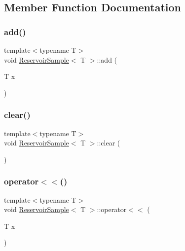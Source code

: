 \subsection{Member Function Documentation}
\mbox{\label{class_reservoir_sample_a471e41debe8c7081cbae2f5a1ca4ab54}} 
\subsubsection{\texorpdfstring{add()}{add()}}
{\footnotesize\ttfamily template$<$typename T$>$ \\
void \hyperlink{class_reservoir_sample}{Reservoir\+Sample}$<$ T $>$\+::add (\begin{DoxyParamCaption}\item[{T}]{x }\end{DoxyParamCaption})\hspace{0.3cm}{\ttfamily [inline]}}

\mbox{\label{class_reservoir_sample_a8527b800cc94f227a7793e8c93055d82}} 
\subsubsection{\texorpdfstring{clear()}{clear()}}
{\footnotesize\ttfamily template$<$typename T$>$ \\
void \hyperlink{class_reservoir_sample}{Reservoir\+Sample}$<$ T $>$\+::clear (\begin{DoxyParamCaption}{ }\end{DoxyParamCaption})\hspace{0.3cm}{\ttfamily [inline]}}

\mbox{\label{class_reservoir_sample_a06e60e404cf49a9261f51d6b07bbf017}} 
\subsubsection{\texorpdfstring{operator$<$$<$()}{operator<<()}}
{\footnotesize\ttfamily template$<$typename T$>$ \\
void \hyperlink{class_reservoir_sample}{Reservoir\+Sample}$<$ T $>$\+::operator$<$$<$ (\begin{DoxyParamCaption}\item[{T}]{x }\end{DoxyParamCaption})\hspace{0.3cm}{\ttfamily [inline]}}

